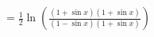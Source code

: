 \documentclass[preview]{standalone}
\begin{document}
\begin{align*}
=\frac{1}{2} \ln \left( \frac{(1 + \sin{x})(1 + \sin{x})}{(1 - \sin{x})(1 + \sin{x})} \right)
\end{align*}
\end{document}
